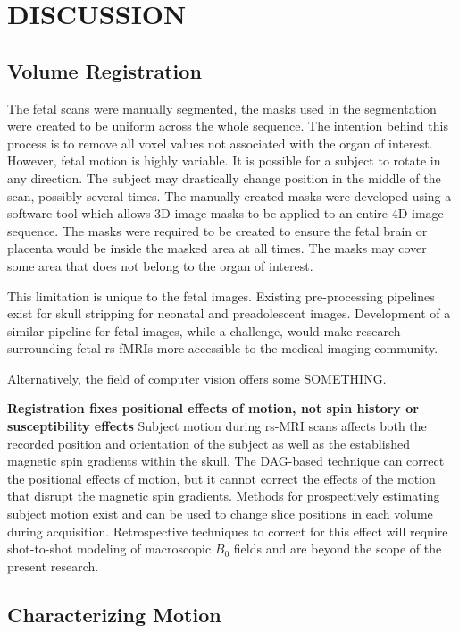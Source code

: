 \chapter{DISCUSSION}
\label{ch:discussion}

\section{Volume Registration}

The fetal scans were manually segmented, the masks used in the segmentation were created to be uniform across the whole sequence. The intention behind this process is to remove all voxel values not associated with the organ of interest. However, fetal motion is highly variable. It is possible for a subject to rotate in any direction. The subject may drastically change position in the middle of the scan, possibly several times. The manually created masks were developed using a software tool which allows 3D image masks to be applied to an entire 4D image sequence. The masks were required to be created to ensure the fetal brain or placenta would be inside the masked area at all times. The masks may cover some area that does not belong to the organ of interest.

This limitation is unique to the fetal images. Existing pre-processing pipelines exist for skull stripping for neonatal and preadolescent images. Development of a similar pipeline for fetal images, while a challenge, would make research surrounding fetal rs-fMRIs more accessible to the medical imaging community.

Alternatively, the field of computer vision offers some SOMETHING.

\textbf{Registration fixes positional effects of motion, not spin history or susceptibility effects}
Subject motion during rs-MRI scans affects both the recorded position and orientation of the subject as well as the established magnetic spin gradients within the skull. The DAG-based technique can correct the positional effects of motion, but it cannot correct the effects of the motion that disrupt the magnetic spin gradients. Methods for prospectively estimating subject motion exist and can be used to change slice positions in each volume during acquisition. Retrospective techniques to correct for this effect will require shot-to-shot modeling of macroscopic $B_0$ fields and are beyond the scope of the present research.

\section{Characterizing Motion}

